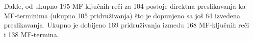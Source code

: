 Dakle, od ukupno 195 MF-ključnih reči za 104 postoje direktna preslikavanja ka MF-terminima (ukupno 105 pridruživanja) što je dopunjeno sa još  64 izvedena
preslikavanja.  Ukupno je dobijeno 169 pridruživanja između 168 MF-ključnih reči i
138 MF-termina.



%
%
%



